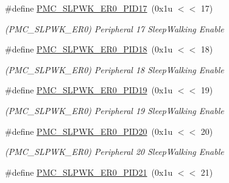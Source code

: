 \begin{DoxyCompactItemize}
\mbox{\label{group__SAME70__PMC_ga0edf786eabc0ca3cf5b8b583f7a59ff8}} 
\#define \mbox{\hyperlink{group__SAME70__PMC_ga0edf786eabc0ca3cf5b8b583f7a59ff8}{P\+M\+C\+\_\+\+S\+L\+P\+W\+K\+\_\+\+E\+R0\+\_\+\+P\+I\+D17}}~(0x1u $<$$<$ 17)
\begin{DoxyCompactList}\small\item\em (P\+M\+C\+\_\+\+S\+L\+P\+W\+K\+\_\+\+E\+R0) Peripheral 17 Sleep\+Walking Enable \end{DoxyCompactList}\item 
\mbox{\label{group__SAME70__PMC_ga00c98e4030fb34cad748b3008bd1d66e}} 
\#define \mbox{\hyperlink{group__SAME70__PMC_ga00c98e4030fb34cad748b3008bd1d66e}{P\+M\+C\+\_\+\+S\+L\+P\+W\+K\+\_\+\+E\+R0\+\_\+\+P\+I\+D18}}~(0x1u $<$$<$ 18)
\begin{DoxyCompactList}\small\item\em (P\+M\+C\+\_\+\+S\+L\+P\+W\+K\+\_\+\+E\+R0) Peripheral 18 Sleep\+Walking Enable \end{DoxyCompactList}\item 
\mbox{\label{group__SAME70__PMC_gab43119eba8c2f4ab723c00849169523f}} 
\#define \mbox{\hyperlink{group__SAME70__PMC_gab43119eba8c2f4ab723c00849169523f}{P\+M\+C\+\_\+\+S\+L\+P\+W\+K\+\_\+\+E\+R0\+\_\+\+P\+I\+D19}}~(0x1u $<$$<$ 19)
\begin{DoxyCompactList}\small\item\em (P\+M\+C\+\_\+\+S\+L\+P\+W\+K\+\_\+\+E\+R0) Peripheral 19 Sleep\+Walking Enable \end{DoxyCompactList}\item 
\mbox{\label{group__SAME70__PMC_gab09575cb5cad6e76033ba550f6eba4cf}} 
\#define \mbox{\hyperlink{group__SAME70__PMC_gab09575cb5cad6e76033ba550f6eba4cf}{P\+M\+C\+\_\+\+S\+L\+P\+W\+K\+\_\+\+E\+R0\+\_\+\+P\+I\+D20}}~(0x1u $<$$<$ 20)
\begin{DoxyCompactList}\small\item\em (P\+M\+C\+\_\+\+S\+L\+P\+W\+K\+\_\+\+E\+R0) Peripheral 20 Sleep\+Walking Enable \end{DoxyCompactList}\item 
\mbox{\label{group__SAME70__PMC_ga6018bba1ff61d49b66340adeb558032c}} 
\#define \mbox{\hyperlink{group__SAME70__PMC_ga6018bba1ff61d49b66340adeb558032c}{P\+M\+C\+\_\+\+S\+L\+P\+W\+K\+\_\+\+E\+R0\+\_\+\+P\+I\+D21}}~(0x1u $<$$<$ 21)
$$
\end{DoxyCompactItemize}
